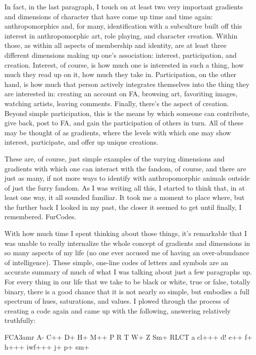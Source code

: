In fact, in the last paragraph, I touch on at least two very important gradients and dimensions of character that have come up time and time again: anthropomorphics and, for many, identification with a subculture built off this interest in anthropomorphic art, role playing, and character creation. Within those, as within all aspects of membership and identity, are at least three different dimensions making up one's association: interest, participation, and creation. Interest, of course, is how much one is interested in such a thing, how much they read up on it, how much they take in. Participation, on the other hand, is how much that person actively integrates themselves into the thing they are interested in: creating an account on FA, browsing art, favoriting images, watching artists, leaving comments. Finally, there's the aspect of creation. Beyond simple participation, this is the means by which someone can contribute, give back, post to FA, and gain the participation of others in turn. All of these may be thought of as gradients, where the levels with which one may show interest, participate, and offer up unique creations.

These are, of course, just simple examples of the varying dimensions and gradients with which one can interact with the fandom, of course, and there are just as many, if not more ways to identify with anthropomorphic animals outside of just the furry fandom. As I was writing all this, I started to think that, in at least one way, it all sounded familiar. It took me a moment to place where, but the further back I looked in my past, the closer it seemed to get until finally, I remembered. FurCodes.

With how much time I spent thinking about those things, it's remarkable that I was unable to really internalize the whole concept of gradients and dimensions in so many aspects of my life (no one ever accused me of having an over-abundance of intelligence). These simple, one-line codes of letters and symbols are an accurate summary of much of what I was talking about just a few paragraphs up. For every thing in our life that we take to be black or white, true or false, totally binary, there is a good chance that it is not nearly so simple, but embodies a full spectrum of hues, saturations, and values. I plowed through the process of creating a code again and came up with the following, answering relatively truthfully:

FCA3amr A- C++ D+ H+ M++ P R T W+ Z Sm+ RLCT a cl+++ d! e++ f+ h+++ iwf+++ j+ p+ sm+

